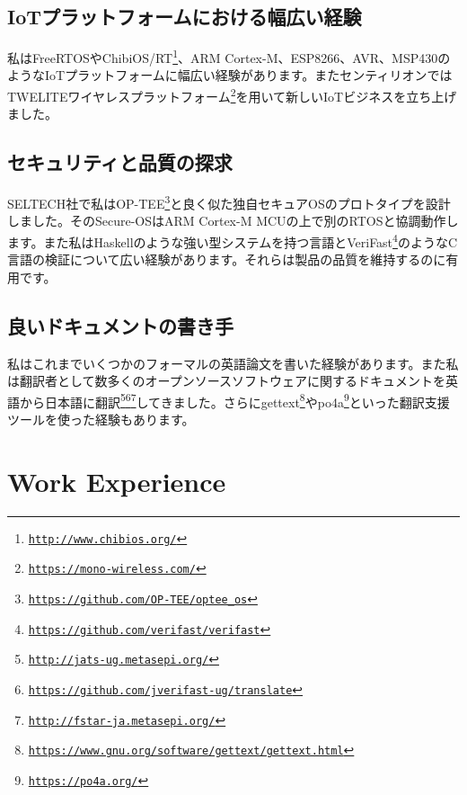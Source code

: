 \documentclass[letterpaper]{article}
\begin{document}
\subsection*{IoTプラットフォームにおける幅広い経験}

私はFreeRTOSやChibiOS/RT\footnote{\href{http://www.chibios.org/}{\tt http://www.chibios.org/}}、ARM Cortex-M、ESP8266、AVR、MSP430のようなIoTプラットフォームに幅広い経験があります。またセンティリオンではTWELITEワイヤレスプラットフォーム\footnote{\href{https://mono-wireless.com/}{\tt https://mono-wireless.com/}}を用いて新しいIoTビジネスを立ち上げました。

\subsection*{セキュリティと品質の探求}

SELTECH社で私はOP-TEE\footnote{\href{https://github.com/OP-TEE/optee\_os}{\tt https://github.com/OP-TEE/optee\_os}}と良く似た独自セキュアOSのプロトタイプを設計しました。そのSecure-OSはARM Cortex-M MCUの上で別のRTOSと協調動作します。また私はHaskellのような強い型システムを持つ言語とVeriFast\footnote{\href{https://github.com/verifast/verifast}{\tt https://github.com/verifast/verifast}}のようなC言語の検証について広い経験があります。それらは製品の品質を維持するのに有用です。

\subsection*{良いドキュメントの書き手}

私はこれまでいくつかのフォーマルの英語論文を書いた経験があります。また私は翻訳者として数多くのオープンソースソフトウェアに関するドキュメントを英語から日本語に翻訳\footnote{\href{http://jats-ug.metasepi.org/}{\tt http://jats-ug.metasepi.org/}}\footnote{\href{https://github.com/jverifast-ug/translate}{\tt https://github.com/jverifast-ug/translate}}\footnote{\href{http://fstar-ja.metasepi.org/}{\tt http://fstar-ja.metasepi.org/}}してきました。さらにgettext\footnote{\href{https://www.gnu.org/software/gettext/gettext.html}{\tt https://www.gnu.org/software/gettext/gettext.html}}やpo4a\footnote{\href{https://po4a.org/}{\tt https://po4a.org/}}といった翻訳支援ツールを使った経験もあります。

\newpage

\section*{Work Experience}
\end{document}
